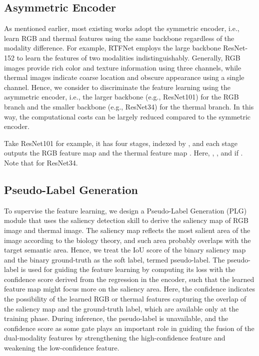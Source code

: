 \documentclass[10.5pt,twocolumn,journal,letterpaper]{IEEEtran}
\newcommand{\eg}{e.g.}
\newcommand{\ie}{i.e.}
\begin{document}
\subsection{Asymmetric Encoder}
As mentioned earlier, most existing works \cite{sun-ral2019-rtfnet,sun-tase2021-fuseseg} adopt the symmetric encoder, \ie, learn RGB and thermal features using the same backbone regardless of the modality difference. For example, RTFNet \cite{sun-ral2019-rtfnet} employs the large backbone ResNet-152 \cite{he-cvpr2016-resnet} to learn the features of two modalities indistinguishably. Generally, RGB images provide rich color and texture information using three channels, while thermal images indicate coarse location and obscure appearance using a single channel. Hence, we consider to discriminate the feature learning using the asymmetric encoder, \ie, the larger backbone (\eg, ResNet101) for the RGB branch and the smaller backbone (\eg, ResNet34) for the thermal branch. In this way, the computational costs can be largely reduced compared to the symmetric encoder.

Take ResNet101 for example, it has four stages, indexed by , and each stage outputs the RGB feature map  and the thermal feature map . Here, , , and  if . Note that  for ResNet34.

\subsection{Pseudo-Label Generation}
To supervise the feature learning, we design a Pseudo-Label Generation (PLG) module that uses the saliency detection skill to derive the saliency map of RGB image and thermal image. The saliency map reflects the most salient area of the image according to the biology theory\cite{itti-pami1998-model}, and such area probably overlaps with the target semantic area. Hence, we treat the IoU score of the binary saliency map and the binary ground-truth as the soft label, termed pseudo-label. The pseudo-label is used for guiding the feature learning by computing its loss with the confidence score derived from the regression in the encoder, such that the learned feature map might focus more on the saliency area. Here, the confidence indicates the possibility of the learned RGB or thermal features capturing the overlap of the saliency map and the ground-truth label, which are available only at the training phase. During inference, the pseudo-label is unavailable, and the confidence score as some gate plays an important role in guiding the fusion of the dual-modality features by strengthening the high-confidence feature and weakening the low-confidence feature.
\end{document}
